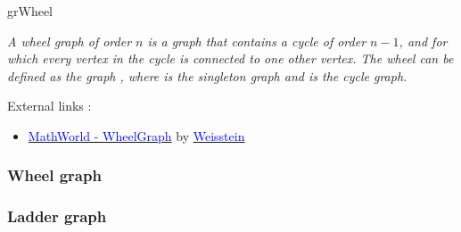 \begin{NewMacroBox}{grWheel}{}

\medskip
\emph{A wheel graph   of order $n$  is a graph that contains a cycle of order $n-1$, and for which every  vertex in the cycle is connected to one other  vertex. The wheel  can be defined as the graph , where  is the singleton graph and  is the cycle graph.}

\medskip
External links :

\medskip
\begin{itemize}
\item \href{http://mathworld.wolfram.com/WheelGraph.html}%
           {\textcolor{blue}{MathWorld - WheelGraph}} by %
      \href{http://en.wikipedia.org/wiki/Eric_W._Weisstein}%
           {\textcolor{blue}{Weisstein}}
\end{itemize}
\end{NewMacroBox}

\SetUpEdge[style={thick,%
                  double          = orange,%
                  double distance = 1pt}]

\SetVertexNoLabel
{}

\vfill
\subsubsection{Wheel graph}
\begin{center}
\begin{tkzexample}[vbox]
\end{tkzexample}
\end{center}
\newpage
\subsubsection{Ladder graph}

